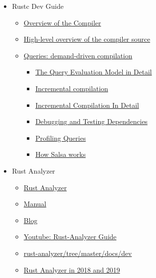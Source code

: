 \documentclass[12pt, a4paper]{report}
\begin{document}
\begin{itemize}[noitemsep]
\item Rustc Dev Guide
	\begin{itemize}[noitemsep]
	\item \href{https://rustc-dev-guide.rust-lang.org/overview.html}{\Square Overview of the Compiler}
	\item \href{https://rustc-dev-guide.rust-lang.org/compiler-src.html}{\Square High-level overview of the compiler source}
	\item \href{https://rustc-dev-guide.rust-lang.org/query.html}{\Square Queries: demand-driven compilation}
		\begin{itemize}[noitemsep]
		\item \href{https://rustc-dev-guide.rust-lang.org/queries/query-evaluation-model-in-detail.html}{\Square The Query Evaluation Model in Detail}
		\item \href{https://rustc-dev-guide.rust-lang.org/queries/incremental-compilation.html}{\Square Incremental compilation}
		\item \href{https://rustc-dev-guide.rust-lang.org/queries/incremental-compilation-in-detail.html}{\Square Incremental Compilation In Detail}
		\item \href{https://rustc-dev-guide.rust-lang.org/incrcomp-debugging.html}{\Square Debugging and Testing Dependencies}
		\item \href{https://rustc-dev-guide.rust-lang.org/queries/profiling.html}{\Square Profiling Queries}
		\item \href{https://rustc-dev-guide.rust-lang.org/salsa.html}{\Square How Salsa works}
		\end{itemize}
	\end{itemize}
\item Rust Analyzer
	\begin{itemize}[noitemsep]
	\item \href{https://rust-analyzer.github.io/}{\Square Rust Analyzer}
	\item \href{https://rust-analyzer.github.io/manual.html}{\Square Manual}
	\item \href{https://rust-analyzer.github.io/blog}{\Square Blog}
	\item \href{https://youtu.be/ANKBNiSWyfc}{\Square Youtube: Rust-Analyzer Guide}
	\item \href{https://github.com/rust-analyzer/rust-analyzer/tree/master/docs/dev}{\Square rust-analyzer/tree/master/docs/dev}
	\item \href{https://ferrous-systems.com/blog/rust-analyzer-2019/}{\Square Rust Analyzer in 2018 and 2019}

\end{itemize}
\end{itemize}
\end{document}
